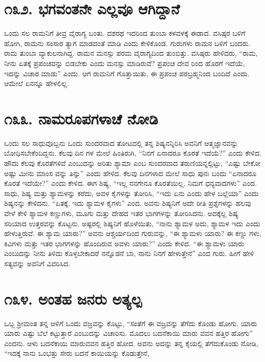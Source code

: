 \section{\num{೧೩೨. } ಭಗವಂತನೇ ಎಲ್ಲವೂ ಆಗಿದ್ದಾನೆ}

ಒಂದು ಸಲ ರಾಮನಿಗೆ ತೀವ್ರ ವೈರಾಗ್ಯ ಬಂತು. ದಶರಥ ಇದರಿಂದ ತುಂಬಾ ಕಳವಳಕ್ಕೆ ಈಡಾದ. ವಸಿಷ್ಠರ ಬಳಿಗೆ ಹೋಗಿ, ರಾಮನು ಸಂಸಾರ ತ್ಯಾಗ ಮಾಡದಂತೆ ಮಾಡಿ ಎಂದು ಕೇಳಿಕೊಂಡ. ಗುರುಗಳು ರಾಮನ ಬಳಿಗೆ ಬಂದರು. ರಾಮ ತುಂಬಾ ವ್ಯಾಕುಲನಾಗಿದ್ದ. ರಾಮನ ಮನಸ್ಸು ಪರಮ ವೈರಾಗ್ಯದಿಂದ ತುಂಬಿತ್ತು. ವಸಿಷ್ಠರು ಹೇಳಿದರು, “ರಾಮ, ನೀನು ಏತಕ್ಕೆ ಪ್ರಪಂಚವನ್ನು ಬಿಡಬೇಕು ಎಂದು ಮನಸ್ಸು ಮಾಡಿರುವೆ? ಪ್ರಪಂಚ ದೇವ ರಿಂದ ಹೊರಗೆ ಇದೆಯೆ, ಇದನ್ನು ವಿಚಾರ ಮಾಡು” ಎಂದು. ಆಗ ರಾಮನಿಗೆ ಗೊತ್ತಾಯಿತು, ಈ ಪ್ರಪಂಚ ಪರಬ್ರಹ್ಮನಿಂದ ಬಂದಿದೆ ಎಂದು. ಆಮೇಲೆ ಏನನ್ನೂ ಹೇಳಲಿಲ್ಲ.


\section{\num{೧೩೩. } ನಾಮರೂಪಗಳಾಚೆ ನೋಡಿ}

ಒಂದು ಸಲ ಸಾಧುವೊಬ್ಬನು ಒಂದು ಸುಂದರವಾದ ತೋಟದಲ್ಲಿ ತನ್ನ ಶಿಷ್ಯನನ್ನಿರಿಸಿ ಅವನಿಗೆ ಆತ್ಮಜ್ಞಾನವನ್ನು ಬೋಧಿಸಬೇಕೆಂದಿದ್ದನು. ಕೆಲವು ದಿನ ಗಳ ಮೇಲೆ ಹಿಂತಿರುಗಿ, “ನಿನಗೆ ಏನಾದರೂ ಕೊರತೆ ಇದೆಯೆ?” ಎಂದು ಕೇಳಿದ. ಹೌದು ಕೆಲವು ಕೊರತೆಗಳಿವೆ ಎಂಬುದನ್ನು ಅರಿತು ಶ್ಯಾಮಾ ಎಂಬ ಸುಂದರವಾದ ತರುಣಿಯನ್ನಲ್ಲಿಟ್ಟು, “ಎಷ್ಟು ಬೇಕೋ ಅಷ್ಟು ಮೀನು ಮಾಂಸ ವನ್ನು ತಿನ್ನು” ಎಂದು ಹೇಳಿದ. ಕೆಲವು ದಿನಗಳಾದ ಮೇಲೆ ಸಾಧು ಪುನಃ ಬಂದು “ಏನಾದರೂ ಕೊರತೆ ಇದೆಯೇ?” ಎಂದು ಕೇಳಿದ. ಈಗ ಶಿಷ್ಯ, “ಇಲ್ಲ ನನಗೇನೂ ಕೊರತೆಯಿಲ್ಲ. ನಿಮಗೆ ಧನ್ಯವಾದಗಳು” ಎಂದ. ಸಾಧು, ಶಿಷ್ಯ ಮತ್ತು ಶ್ಯಾಮಳನ್ನು ಕರೆದು, ಅವಳ ಕೈಗಳನ್ನು ತೋರಿಸಿ, “ಇದು ಏನು ಎಂದು ಹೇಳ ಬಲ್ಲೆಯಾ” ಎಂದು ಶಿಷ್ಯನನ್ನು ಕೇಳಿದನು. “ಏತಕ್ಕೆ, ಇದು ಶ್ಯಾಮಳ ಕೈಗಳು” ಎಂದ. ಅವನು ಶಿಷ್ಯನಿಗೆ ಅದೇ ರೀತಿ ಪ್ರಶ್ನೆಗಳನ್ನು ಹಲವು ವೇಳೆ ಕೇಳಿ ಶ್ಯಾಮಳ ಕಣ್ಣುಗಳು, ಮೂಗು ಮತ್ತು ದೇಹದ ಇತರ ಭಾಗಗಳನ್ನು ತೋರಿಸಿದನು. ಅದಕ್ಕೆಲ್ಲ ಶಿಷ್ಯ ಸರಿಯಾದ ಉತ್ತರವನ್ನು ಕೊಟ್ಟನು. ಅಷ್ಟರಲ್ಲಿ ಶಿಷ್ಯನಿಗೆ ಹೊಳೆಯಿತು, “ನಾನು ಶ್ಯಾಮಳ ಅದು, ಶ್ಯಾಮಳ ಇದು ಎಂದು ಹೇಳುತ್ತಿರುವೆ. ಈ ಶ್ಯಾಮ ಯಾರು?” ಅವನು ಆಶ್ಚರ್ಯದಿಂದ ಗುರುವನ್ನು, “ಈ ಶ್ಯಾಮಳು ಯಾರು? ಈ ಕಣ್ಣು ಗಳು, ಕಿವಿಗಳು ಮತ್ತು ಇತರ ಭಾಗಗಳನ್ನು ಹೊಂದಿರುವ ಅವಳು ಯಾರು?” ಎಂದು ಕೇಳಿದ. “ಈ ಶ್ಯಾಮಳು ಯಾರು ಎಂಬುದನ್ನು ನೀನು ತಿಳಿದು ಕೊಳ್ಳಬೇಕಾದರೆ ನನ್ನೊಡನೆ ಬಾ, ನಾನು ನಿನಗೆ ಹೇಳುತ್ತೇನೆ” ಎಂದ ಗುರು. ಹೀಗೆ ಹೇಳಿ ಸತ್ಯವನ್ನು ಅವನಿಗೆ ವಿವರಿಸಿದ.


\section{\num{೧೩೪. } ಅಂತಹ ಜನರು ಅತ್ಯಲ್ಪ}

ಒಬ್ಬ ಶ್ರೀಮಂತ ತನ್ನ ಆಳಿಗೆ ಒಂದು ವಜ್ರವನ್ನು ಕೊಟ್ಟು, “ಸಂತೆಗೆ ಈ ವಜ್ರವನ್ನು ತೆಗೆದು ಕೊಂಡು ಹೋಗು. ಯಾರು ಯಾರು ಎಷ್ಟು ಬೆಲೆ ಕಟ್ಟುತ್ತಾರೆ ಎಂಬುದನ್ನು ವಿಚಾರಿಸು. ಮೊದಲು ಬದನೆಕಾಯಿ ಮಾರು ವವನ ಹತ್ತಿರ ಹೋಗು” ಎಂದನು. ಆಳು ಬದನೆಕಾಯಿ ಮಾರುವವನ ಹತ್ತಿರ ಹೋದ. ಅವನು ಅದನ್ನು ತನ್ನ ಕೈಯಲ್ಲಿ ತೆಗೆದುಕೊಂಡು ನೋಡಿ, “ಇದಕ್ಕೆ ನಾನು ಒಂಭತ್ತು ಸೇರು ಬದನೆ ಕಾಯಿಯನ್ನು ಕೊಡುತ್ತೇನೆ,


